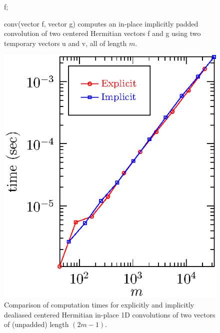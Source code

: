 \documentclass[final]{siamltex}
\begin{document}
\begin{figure}[htbp]
\begin{minipage}{.49\linewidth}
\begin{center}
\begin{function}[H]
  \medskip
  \Return f;
\caption{conv(vector {\sf f}, vector {\sf g}) computes
an in-place implicitly padded convolution of two centered Hermitian vectors
{\sf f} and {\sf g} using two temporary vectors {\sf u} and {\sf v}, all of length
$m$.}\label{conv}
\end{function}
\end{center}
\end{minipage}
\begin{minipage}{0.49\linewidth}
\begin{center}
\includegraphics{timing1r}
\caption{Comparison of computation times for explicitly and implicitly
dealiased centered Hermitian in-place 1D convolutions of two vectors of
(unpadded) length $(2m-1)$.}
\label{timing1r}
\end{center}
\end{minipage}
\end{figure}
\end{document}
